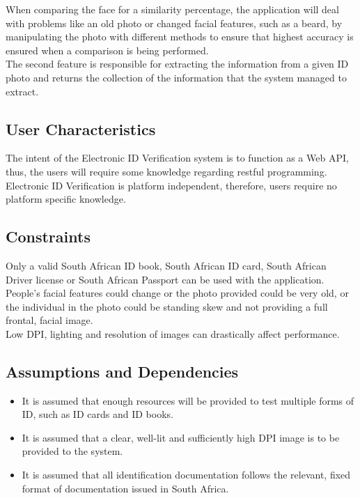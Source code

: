 \documentclass{article}
\def \project{Electronic ID Verification }
\begin{document}
		  \noindent When comparing the face for a similarity percentage, the application will deal with problems like an old photo or changed facial features, such as a beard, by manipulating the photo with different methods to ensure that highest accuracy is ensured when a comparison is being performed.\\
		  
		  \noindent The second feature is responsible for extracting the information from a given ID photo and returns the collection of the information that the system managed to extract.

		\subsection{User Characteristics}\label{subsec:overall-user-characteristics}
		    The intent of the \project system is to function as a Web API, thus, the users will require some knowledge regarding restful programming. \project is platform independent, therefore, users require no platform specific knowledge.

		\subsection{Constraints}\label{subsec:overall-constraints}
			Only a valid South African ID book, South African ID card, South African Driver license or South African Passport can be used with the application.\\
			
			\noindent People's facial features could change or the photo provided could be very old, or the individual in the photo could be standing skew and not providing a full frontal, facial image.\\

			\noindent Low DPI, lighting and resolution of images can drastically    affect performance.

		\subsection{Assumptions and Dependencies}\label{subsec:overall-asusmptions-and-dependencies}
		\begin{itemize}
		    \item It is assumed that enough resources will be provided to test multiple forms of ID, such as ID cards and ID books.
		    \item It is assumed that a clear, well-lit and sufficiently high DPI image is to be provided to the system.
		    \item It is assumed that all identification documentation follows the relevant, fixed format of documentation issued in South Africa.
		\end{itemize}
			
\end{document}
